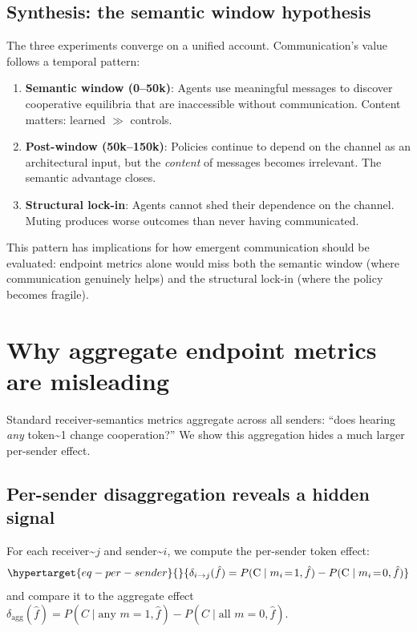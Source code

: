 \documentclass[
  10pt,
  letterpaper,
]{article}
\newcommand{\pcoopgiven}[1]{P(\text{C} \mid #1)}
\newcommand{\fhat}{\hat{f}}
\begin{document}
\hypertarget{synthesis-the-semantic-window-hypothesis}{%
\subsection{Synthesis: the semantic window
hypothesis}\label{synthesis-the-semantic-window-hypothesis}}

The three experiments converge on a unified account. Communication's
value follows a temporal pattern:

\begin{enumerate}[leftmargin=*,nosep]
  \item \textbf{Semantic window (0--50k)}: Agents use meaningful messages to discover cooperative equilibria that are inaccessible without communication. Content matters: learned $\gg$ controls.
  \item \textbf{Post-window (50k--150k)}: Policies continue to depend on the channel as an architectural input, but the \emph{content} of messages becomes irrelevant. The semantic advantage closes.
  \item \textbf{Structural lock-in}: Agents cannot shed their dependence on the channel. Muting produces worse outcomes than never having communicated.
\end{enumerate}

This pattern has implications for how emergent communication should be
evaluated: endpoint metrics alone would miss both the semantic window
(where communication genuinely helps) and the structural lock-in (where
the policy becomes fragile).

\hypertarget{sec-metrics}{%
\section{Why aggregate endpoint metrics are
misleading}\label{sec-metrics}}

Standard receiver-semantics metrics aggregate across all senders: ``does
hearing \emph{any} token\textasciitilde1 change cooperation?'' We show
this aggregation hides a much larger per-sender effect.

\hypertarget{per-sender-disaggregation-reveals-a-hidden-signal}{%
\subsection{Per-sender disaggregation reveals a hidden
signal}\label{per-sender-disaggregation-reveals-a-hidden-signal}}

For each receiver\textasciitilde{}\(j\) and
sender\textasciitilde{}\(i\), we compute the per-sender token effect:
\begin{equation}\protect\hypertarget{eq-per-sender}{}{
  \delta_{i \to j}(\fhat) = \pcoopgiven{m_i\!=\!1, \fhat} - \pcoopgiven{m_i\!=\!0, \fhat}
}\label{eq-per-sender}\end{equation} and compare it to the aggregate
effect
\(\delta_{\text{agg}}(\fhat) = P(C \mid \text{any } m\!=\!1, \fhat) - P(C \mid \text{all } m\!=\!0, \fhat)\).
\end{document}
